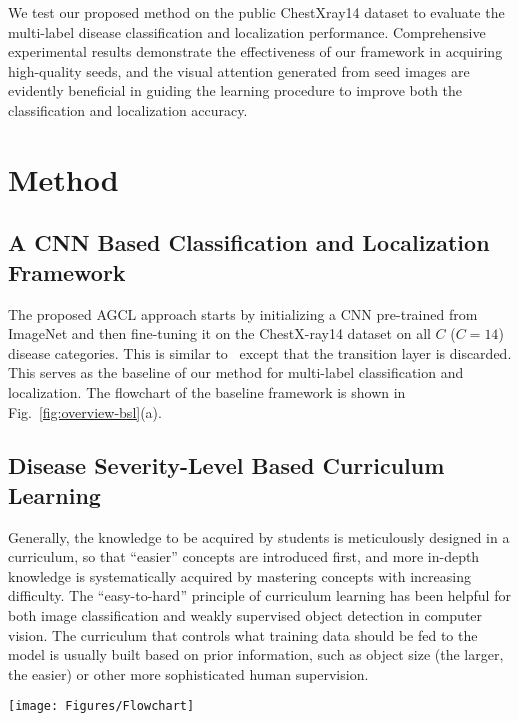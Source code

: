 \documentclass[runningheads,a4paper]{llncs}
\begin{document}
We test our proposed method on the public ChestXray14 dataset to evaluate the multi-label disease classification and localization performance. Comprehensive experimental results demonstrate the effectiveness of our framework in acquiring high-quality seeds, and the visual attention generated from seed images are evidently beneficial in guiding the learning procedure to improve both the classification and localization accuracy.

\section{Method}

\subsection{A CNN Based Classification and Localization Framework}
\label{baseline_model}

The proposed AGCL approach starts by initializing a CNN pre-trained from ImageNet and then fine-tuning it on the ChestX-ray14 dataset on all $C$ ($C=14$) disease categories. This is similar to~\cite{Wang_CVPR2017} except that the transition layer is discarded. This serves as the baseline of our method for multi-label classification and localization. 
The flowchart of the baseline framework is shown in Fig.~\ref{fig:overview-bsl}(a). 

\subsection{Disease Severity-Level Based Curriculum Learning}
\label{CL}

Generally, the knowledge to be acquired by students is meticulously designed in a curriculum, so that ``easier'' concepts are introduced first, and more in-depth knowledge is systematically acquired by mastering concepts with increasing difficulty. The ``easy-to-hard'' principle of curriculum learning \cite{bengio_icml2009} has been helpful for both image classification and weakly supervised object detection \cite{Shi_eccv2016} in computer vision. The curriculum that controls what training data should be fed to the model is usually built based on prior information, such as object size (the larger, the easier) or other more sophisticated human supervision.

\begin{figure*}[tbp!]
	\centering
	\texttt{[image: Figures/Flowchart]}
	\caption{Overall architecture of attention-guided curriculum learning (AGCL).}
	\label{fig:overview-bsl}
\end{figure*}
\end{document}
